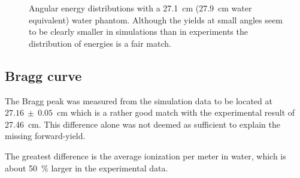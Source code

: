 \begin{figure}[!ht]
\centering
{}
\label{fig:AngularEnergyDistribution}
\caption[Optional caption for list of figures]{Angular energy distributions with a 27.1~cm (27.9~cm water equivalent) water phantom. Although the yields at small angles seem to be clearly smaller in simulations than in experiments the distribution of energies is a fair match.}
\end{figure}

\subsection{Bragg curve}
The Bragg peak was measured from the simulation data to be located at $27.16~\pm~0.05$~cm which is a rather good match with the experimental result of 27.46~cm. This difference alone was not deemed as sufficient to explain the missing forward-yield.

The greatest difference is the average ionization per meter in water, which is about 50~\% larger in the experimental data. %



